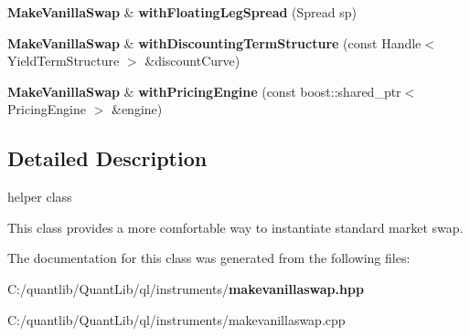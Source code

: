 \begin{DoxyCompactItemize}
\item 
{\bf Make\+Vanilla\+Swap} \& {\bfseries with\+Floating\+Leg\+Spread} (Spread sp)\label{class_quant_lib_1_1_make_vanilla_swap_a52ad5fa2291b4b993ee1d5e0c926fa61}

\item 
{\bf Make\+Vanilla\+Swap} \& {\bfseries with\+Discounting\+Term\+Structure} (const Handle$<$ Yield\+Term\+Structure $>$ \&discount\+Curve)\label{class_quant_lib_1_1_make_vanilla_swap_a0e553cef6382f263d9635aad15ff341f}

\item 
{\bf Make\+Vanilla\+Swap} \& {\bfseries with\+Pricing\+Engine} (const boost\+::shared\+\_\+ptr$<$ Pricing\+Engine $>$ \&engine)\label{class_quant_lib_1_1_make_vanilla_swap_a08422265c2f0e1b7525d8df17f5558e7}

\end{DoxyCompactItemize}


\subsection{Detailed Description}
helper class 

This class provides a more comfortable way to instantiate standard market swap. 

The documentation for this class was generated from the following files\+:\begin{DoxyCompactItemize}
\item 
C\+:/quantlib/\+Quant\+Lib/ql/instruments/{\bf makevanillaswap.\+hpp}\item 
C\+:/quantlib/\+Quant\+Lib/ql/instruments/makevanillaswap.\+cpp\end{DoxyCompactItemize}
